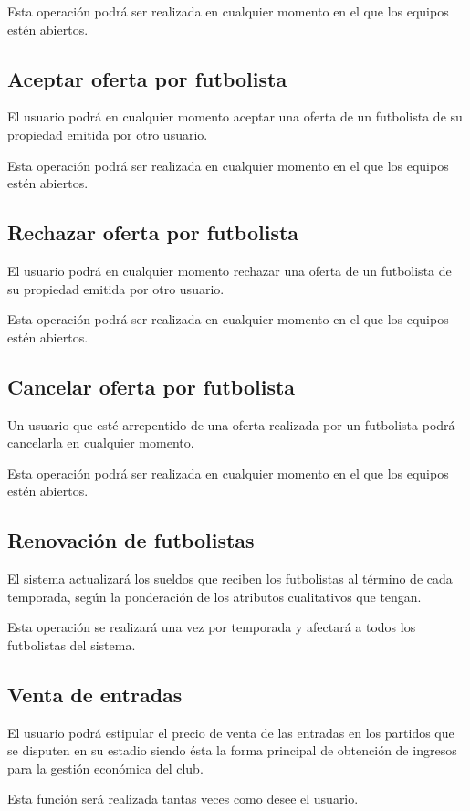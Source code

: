 Esta operación podrá ser realizada en cualquier momento en el que los equipos
estén abiertos.

\subsection*{Aceptar oferta por futbolista}
El usuario podrá en cualquier momento aceptar una oferta de un futbolista de su
propiedad emitida por otro usuario.

Esta operación podrá ser realizada en cualquier momento en el que los equipos
estén abiertos.

\subsection*{Rechazar oferta por futbolista}
El usuario podrá en cualquier momento rechazar una oferta de un futbolista de su
propiedad emitida por otro usuario.

Esta operación podrá ser realizada en cualquier momento en el que los equipos
estén abiertos.

\subsection*{Cancelar oferta por futbolista}
Un usuario que esté arrepentido de una oferta realizada por un futbolista podrá
cancelarla en cualquier momento.

Esta operación podrá ser realizada en cualquier momento en el que los equipos
estén abiertos.

\subsection*{Renovación de futbolistas}
El sistema actualizará los sueldos que reciben los futbolistas al término de
cada temporada, según la ponderación de los atributos cualitativos que tengan.

Esta operación se realizará una vez por temporada y afectará a todos los
futbolistas del sistema.
\subsection*{Venta de entradas}
El usuario podrá estipular el precio de venta de las entradas en los partidos
que se disputen en su estadio siendo ésta la forma principal de obtención de
ingresos para la gestión económica del club.

Esta función será realizada tantas veces como desee el usuario.

